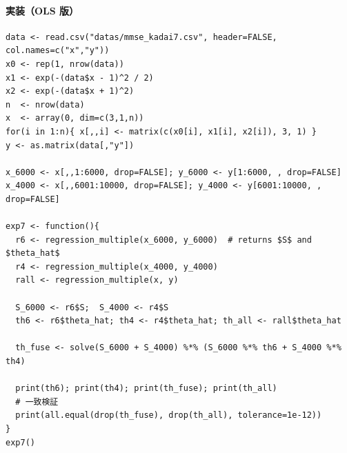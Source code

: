 \paragraph{実装（OLS 版）}
\begin{lstlisting}
data <- read.csv("datas/mmse_kadai7.csv", header=FALSE, col.names=c("x","y"))
x0 <- rep(1, nrow(data))
x1 <- exp(-(data$x - 1)^2 / 2)
x2 <- exp(-(data$x + 1)^2)
n  <- nrow(data)
x  <- array(0, dim=c(3,1,n))
for(i in 1:n){ x[,,i] <- matrix(c(x0[i], x1[i], x2[i]), 3, 1) }
y <- as.matrix(data[,"y"])

x_6000 <- x[,,1:6000, drop=FALSE]; y_6000 <- y[1:6000, , drop=FALSE]
x_4000 <- x[,,6001:10000, drop=FALSE]; y_4000 <- y[6001:10000, , drop=FALSE]

exp7 <- function(){
  r6 <- regression_multiple(x_6000, y_6000)  # returns $S$ and $theta_hat$
  r4 <- regression_multiple(x_4000, y_4000)
  rall <- regression_multiple(x, y)

  S_6000 <- r6$S;  S_4000 <- r4$S
  th6 <- r6$theta_hat; th4 <- r4$theta_hat; th_all <- rall$theta_hat

  th_fuse <- solve(S_6000 + S_4000) %*% (S_6000 %*% th6 + S_4000 %*% th4)

  print(th6); print(th4); print(th_fuse); print(th_all)
  # 一致検証
  print(all.equal(drop(th_fuse), drop(th_all), tolerance=1e-12))
}
exp7()
\end{lstlisting}

